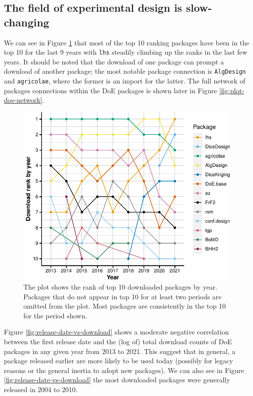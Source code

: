 \documentclass{article}
\begin{document}
\hypertarget{ranking}{%
\subsection{The field of experimental design is
slow-changing}\label{ranking}}

We can see in Figure \ref{fig:rank-over-time} that most of the top 10
ranking packages have been in the top 10 for the last 9 years with
\texttt{lhs} steadily climbing up the ranks in the last few years. It
should be noted that the download of one package can prompt a download
of another package; the most notable package connection is
\texttt{AlgDesign} and \texttt{agricolae}, where the former is an import
for the latter. The full network of packages connections within the DoE
packages is shown later in Figure \ref{fig:plot-doe-network}.

\begin{figure}[htbp]

{\centering \includegraphics{figures/rank-over-time-1} 

}

\caption{The plot shows the rank of top 10 downloaded packages by year. Packages that do not appear in top 10 for at least two periods are omitted from the plot. Most packages are consistently in the top 10 for the period shown.}\label{fig:rank-over-time}
\end{figure}

Figure \ref{fig:release-date-vs-download} shows a moderate negative
correlation between the first release date and the (log of) total
download counts of DoE packages in any given year from 2013 to 2021.
This suggest that in general, a package released earlier are more likely
to be used today (possibly for legacy reasons or the general inertia to
adopt new packages). We can also see in Figure
\ref{fig:release-date-vs-download} the most downloaded packages were
generally released in 2004 to 2010.
\end{document}
